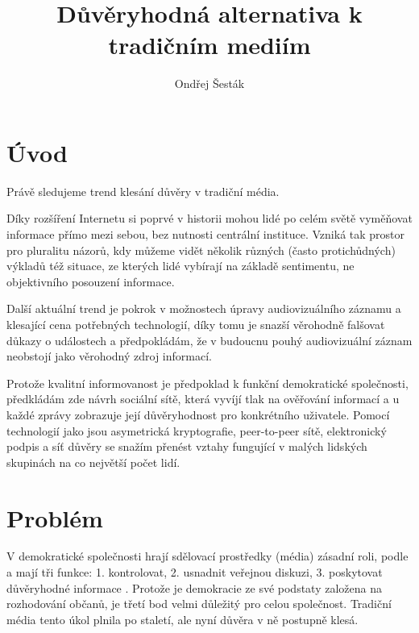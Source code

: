 \documentclass[a4papper]{article}
\begin{document}
\title{Důvěryhodná alternativa k tradičním mediím}
\author{Ondřej Šesták}
\maketitle

\section{Úvod}
\label{ch:uvod}

Právě sledujeme trend klesání důvěry v tradiční média.

Díky rozšíření Internetu si poprvé v historii mohou lidé po celém světě vyměňovat informace přímo mezi sebou, bez nutnosti centrální instituce. Vzniká tak prostor pro pluralitu názorů, kdy můžeme vidět několik různých (často protichůdných) výkladů též situace, ze kterých lidé vybírají na základě sentimentu, ne objektivního posouzení informace.

Další aktuální trend je pokrok v možnostech úpravy audiovizuálního záznamu a klesající cena potřebných technologií, díky tomu je snazší věrohodně falšovat důkazy o událostech a předpokládám, že v budoucnu pouhý audiovizuální záznam neobstojí jako věrohodný zdroj informací.

Protože kvalitní informovanost je předpoklad k funkční demokratické společnosti, předkládám zde návrh sociální sítě, která vyvíjí tlak na ověřování informací a u každé zprávy zobrazuje její důvěryhodnost pro konkrétního uživatele. Pomocí technologií jako jsou asymetrická kryptografie, peer-to-peer sítě, elektronický podpis a síť důvěry se snažím přenést vztahy fungující v malých lidských skupinách na co největší počet lidí.

\section{Problém}
\label{ch:problem}

V demokratické společnosti hrají sdělovací prostředky (média) zásadní roli, podle \citeauthor{netanel01}a mají tři funkce: 1. kontrolovat, 2. usnadnit veřejnou diskuzi, 3. poskytovat důvěryhodné informace \citep{netanel01}. Protože je demokracie ze své podstaty založena na rozhodování občanů, je třetí bod velmi důležitý pro celou společnost. Tradiční média tento úkol plnila po staletí, ale nyní důvěra v ně postupně klesá.
\end{document}
